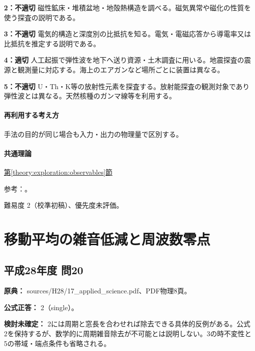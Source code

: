 \noindent\textbf{2：不適切} 磁性鉱床・堆積盆地・地殻熱構造を調べる。磁気異常や磁化の性質を使う探査の説明である。\par

\noindent\textbf{3：不適切} 電気的構造と深度別の比抵抗を知る。電気・電磁応答から導電率又は比抵抗を推定する説明である。\par

\noindent\textbf{4：適切} 人工起振で弾性波を地下へ送り資源・土木調査に用いる。地震探査の震源と観測量に対応する。海上のエアガンなど場所ごとに装置は異なる。\par

\noindent\textbf{5：不適切} U・Th・K等の放射性元素を探査する。放射能探査の観測対象であり弾性波とは異なる。天然核種のガンマ線等を利用する。\par

\paragraph{再利用する考え方} 手法の目的が同じ場合も入力・出力の物理量で区別する。

\paragraph{共通理論} \hyperref[theory:exploration:observables]{第\ref*{theory:exploration:observables}節}

\par 参考：\cite{epa_seismic_reflection,segj_integrated2017}。

\par 難易度 2（校準初稿）、優先度未評価。

\section{移動平均の雑音低減と周波数零点}

\subsection{平成28年度 問20}
\label{q:h28-reg-applied-20}

\noindent\textbf{原典：} sources/H28/17\_applied\_science.pdf、PDF物理8頁。

\textbf{公式正答：} 2（single）。

\par\textbf{検討未確定：} 2には周期と窓長を合わせれば除去できる具体的反例がある。公式2を保持するが、数学的に周期雑音除去が不可能とは説明しない。3の時不変性と5の帯域・端点条件も省略される。

